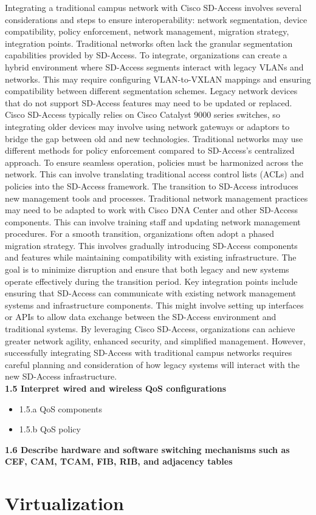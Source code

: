 \documentclass{article}
\begin{document}
	Integrating a traditional campus network with Cisco SD-Access involves several considerations and steps to ensure interoperability: network segmentation, device compatibility, policy enforcement, network management, migration strategy, integration points. Traditional networks often lack the granular segmentation capabilities provided by SD-Access. To integrate, organizations can create a hybrid environment where SD-Access segments interact with legacy VLANs and networks. This may require configuring VLAN-to-VXLAN mappings and ensuring compatibility between different segmentation schemes. Legacy network devices that do not support SD-Access features may need to be updated or replaced. Cisco SD-Access typically relies on Cisco Catalyst 9000 series switches, so integrating older devices may involve using network gateways or adaptors to bridge the gap between old and new technologies. Traditional networks may use different methods for policy enforcement compared to SD-Access’s centralized approach. To ensure seamless operation, policies must be harmonized across the network. This can involve translating traditional access control lists (ACLs) and policies into the SD-Access framework. The transition to SD-Access introduces new management tools and processes. Traditional network management practices may need to be adapted to work with Cisco DNA Center and other SD-Access components. This can involve training staff and updating network management procedures. For a smooth transition, organizations often adopt a phased migration strategy. This involves gradually introducing SD-Access components and features while maintaining compatibility with existing infrastructure. The goal is to minimize disruption and ensure that both legacy and new systems operate effectively during the transition period. Key integration points include ensuring that SD-Access can communicate with existing network management systems and infrastructure components. This might involve setting up interfaces or APIs to allow data exchange between the SD-Access environment and traditional systems. By leveraging Cisco SD-Access, organizations can achieve greater network agility, enhanced security, and simplified management. However, successfully integrating SD-Access with traditional campus networks requires careful planning and consideration of how legacy systems will interact with the new SD-Access infrastructure.\\

\textbf{1.5 Interpret wired and wireless QoS configurations}
\begin{itemize}
\item 1.5.a QoS components
\item 1.5.b QoS policy
\end{itemize}

\textbf{1.6 Describe hardware and software switching mechanisms such as CEF, CAM, TCAM, FIB, RIB, and adjacency tables}


\section{Virtualization}
\end{document}

